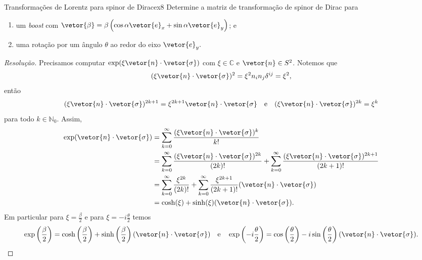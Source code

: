 \begin{exercício}{Transformações de Lorentz para spinor de Dirac}{ex8}
    Determine a matriz de transformação de spinor de Dirac para
    \begin{enumerate}[label=(\alph*)]
        \item um \emph{boost} com \(\vetor{\beta} = \beta\left(\cos\alpha \vetor{e}_x + \sin\alpha \vetor{e}_y\right)\); e
        \item uma rotação por um ângulo \(\theta\) ao redor do eixo \(\vetor{e}_y.\)
    \end{enumerate}
\end{exercício}
\begin{proof}[Resolução]
    Precisamos computar \(\exp(\xi\vetor{n}\cdot\vetor{\sigma})\) com \(\xi \in \mathbb{C}\) e \(\vetor{n} \in S^2\). Notemos que
    \begin{equation*}
        (\xi\vetor{n}\cdot\vetor{\sigma})^2 = \xi^2n_i n_j \delta^{ij} = \xi^2,
    \end{equation*}
    então
    \begin{equation*}
        (\xi\vetor{n} \cdot \vetor{\sigma})^{2k + 1} = \xi^{2k + 1} \vetor{n} \cdot \vetor{\sigma}
        \quad\text{e}\quad
        (\xi\vetor{n} \cdot \vetor{\sigma})^{2k} = \xi^k
    \end{equation*}
    para todo \(k \in \mathbb{N}_0.\) Assim,
    \begin{align*}
        \exp(\vetor{n}\cdot\vetor{\sigma}) &= \sum_{k = 0}^{\infty} \frac{(\xi\vetor{n}\cdot\vetor{\sigma})^k}{k!}\\
                                             &= \sum_{k = 0}^{\infty} \frac{(\xi\vetor{n}\cdot\vetor{\sigma})^{2k}}{(2k)!} + \sum_{k = 0}^{\infty} \frac{(\xi\vetor{n}\cdot\vetor{\sigma})^{2k + 1}}{(2k + 1)!}\\
                                             &= \sum_{k = 0}^\infty \frac{\xi^{2k}}{(2k)!} + \sum_{k = 0}^\infty \frac{\xi^{2k+1}}{(2k+1)!}(\vetor{n}\cdot\vetor{\sigma})\\
                                             &= \cosh(\xi) + \sinh(\xi) (\vetor{n}\cdot\vetor{\sigma}).
    \end{align*}
    Em particular para \(\xi = \frac{\beta}{2}\) e para \(\xi = -i\frac{\theta}{2}\) temos
    \begin{equation*}
        \exp\left(\frac{\beta}{2}\right) = \cosh\left(\frac{\beta}{2}\right) + \sinh\left(\frac{\beta}{2}\right) (\vetor{n}\cdot\vetor{\sigma})
        \quad\text{e}\quad
        \exp\left(-i\frac{\theta}{2}\right) = \cos\left(\frac{\theta}{2}\right) - i\sin\left(\frac{\theta}{2}\right) (\vetor{n}\cdot\vetor{\sigma}).
    \end{equation*}
    

\end{proof}
